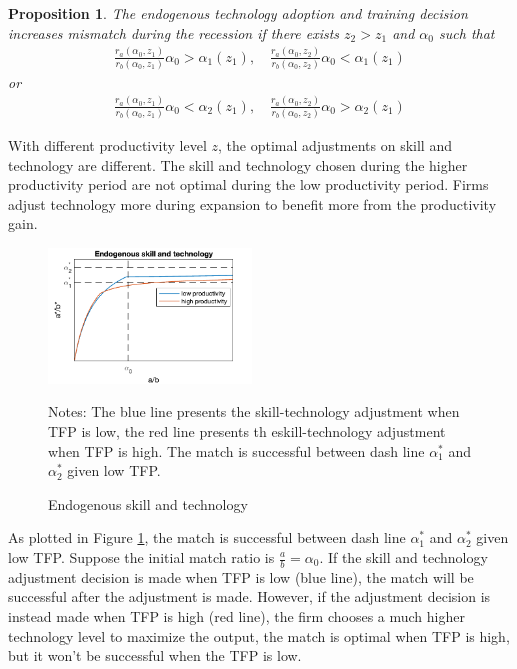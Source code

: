 \documentclass[12pt]{article}
\newtheorem{proposition}{Proposition}
\newcommand{\1}{\mathbb{1}}
\begin{document}
\begin{proposition}
The endogenous technology adoption and training decision increases mismatch during the recession if there exists $z_2>z_1$ and $\alpha_0$ such that 
\begin{align*}
\frac{r_a(\alpha_0,z_1)}{r_b(\alpha_0,z_1)}\alpha_0>\alpha_1(z_1), \quad \frac{r_a(\alpha_0,z_2)}{r_b(\alpha_0,z_2)}\alpha_0<\alpha_1(z_1)
\end{align*}
or 
\begin{align*}
\frac{r_a(\alpha_0,z_1)}{r_b(\alpha_0,z_1)}\alpha_0<\alpha_2(z_1),\quad \frac{r_a(\alpha_0,z_2)}{r_b(\alpha_0,z_2)}\alpha_0>\alpha_2(z_1)
\end{align*}
\end{proposition}
With different productivity level $z$, the optimal adjustments on skill and technology are different. The skill and technology chosen during the higher productivity period are not optimal during the low productivity period. Firms adjust technology more during expansion to benefit more from the productivity gain. 
\begin{figure}[h!]
\begin{center}
\includegraphics[width=0.48\textwidth]{Analytical5}
\end{center}
\caption{Endogenous skill and technology}
\label{Analytical5}
{\scriptsize Notes: The blue line presents the skill-technology adjustment when TFP is low, the red line presents th eskill-technology adjustment when TFP is high. The match is successful between dash line $\alpha_1^*$ and $\alpha_2^*$ given low TFP.} 
\end{figure}
As plotted in Figure \ref{Analytical5}, the match is successful between dash line $\alpha_1^*$ and $\alpha_2^*$ given low TFP. Suppose the initial match ratio is $\frac{a}{b} = \alpha_0$. If the skill and technology adjustment decision is made when TFP is low (blue line), the match will be successful after the adjustment is made. However, if the adjustment decision is instead made when TFP is high (red line), the firm chooses a much higher technology level to maximize the output, the match is optimal when TFP is high, but it won't be successful when the TFP is low.  
\end{document}
